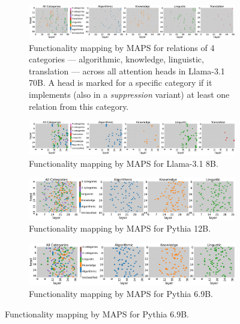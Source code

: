 \documentclass[11pt]{article}
\newcommand{\llamaThreeSeventyB}{Llama-3.1 70B}
\newcommand{\llamaThreeEightB}{Llama-3.1 8B}
\newcommand{\PythiaTwelveB}{Pythia 12B}
\newcommand{\PythiaSevenB}{Pythia 6.9B}
\newcommand{\framework}{\textsc{MAPS}}
\begin{document}
\begin{figure}[htbp]
    \centering
    \begin{subfigure}{\textwidth}
    \includegraphics[width=\textwidth]
    {figures/classified_heads/Meta-Llama-3.1-70B_threshold_0.15}
    \caption{Functionality mapping  by \framework{} for relations of 4 categories --- algorithmic, knowledge, linguistic, translation --- across all attention heads in \llamaThreeSeventyB{}. A head is marked for a specific category if it implements (also in a \emph{suppression} variant) at least one relation from this category.}
    \label{fig:all_classified_heads_llama_70b_appendix}
     \end{subfigure}
     
    \begin{subfigure}{\textwidth}
    \includegraphics[width=\textwidth]
    {figures/classified_heads/Meta-Llama-3.1-8B_threshold_0.15}
    \caption{Functionality mapping  by \framework{} for \llamaThreeEightB{}.}
    \label{fig:all_classified_heads_llama_8b_appendix}
    \end{subfigure}

    
    \begin{subfigure}{\textwidth}
    \includegraphics[width=\textwidth]
    {figures/classified_heads/pythia-12b_threshold_0.15}
    \caption{Functionality mapping  by \framework{} for  \PythiaTwelveB{}.}
    \label{fig:all_classified_heads_pythia_12b_appendix}
    \end{subfigure}

    \begin{subfigure}{\textwidth}
    \includegraphics[width=\textwidth]
    {figures/classified_heads/pythia-6.9b_threshold_0.15}
    \caption{Functionality mapping by \framework{} for \PythiaSevenB{}.}
    \label{fig:all_classified_heads_pythia_6.9b_appendix}
    \end{subfigure}


\end{figure}
\end{document}
